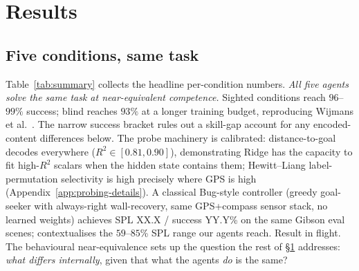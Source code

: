 \documentclass{article}
\newcommand{\hcpending}[1]{{\color{hcpendingcol}#1}}
\begin{document}
\section{Results}
\label{sec:results}

\subsection{Five conditions, same task}
\label{sec:summary}

Table~\ref{tab:summary} collects the headline per-condition numbers. \emph{All five agents solve the same task at near-equivalent competence.} Sighted conditions reach $96$--$99\%$ success; blind reaches $93\%$ at a longer training budget, reproducing Wijmans et al.~\citep{wijmans2023emergence}. The narrow success bracket rules out a skill-gap account for any encoded-content differences below. The probe machinery is calibrated: distance-to-goal decodes everywhere ($R^2 \in [0.81, 0.90]$), demonstrating Ridge has the capacity to fit high-$R^2$ scalars when the hidden state contains them; Hewitt--Liang label-permutation selectivity is high precisely where GPS is high (Appendix~\ref{app:probing-details}).\hcpending{ A classical Bug-style controller (greedy goal-seeker with always-right wall-recovery, same GPS+compass sensor stack, no learned weights) achieves SPL XX.X / success YY.Y\% on the same Gibson eval scenes; contextualises the $59$--$85$\% SPL range our agents reach. Result in flight.} The behavioural near-equivalence sets up the question the rest of §\ref{sec:results} addresses: \emph{what differs internally}, given that what the agents \emph{do} is the same?
\end{document}
